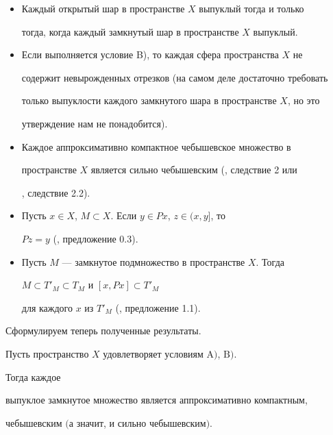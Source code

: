 \begin{itemize}


\item[1.] Каждый открытый шар в пространстве $X$ выпуклый тогда и только


тогда, когда каждый замкнутый шар в пространстве $X$ выпуклый.


\item[2.] Если выполняется условие B), то каждая сфера пространства $X$ не


содержит невырожденных отрезков (на самом деле достаточно требовать


только выпуклости каждого замкнутого шара в пространстве $X$, но это


утверждение нам не понадобится).


\item[3.] Каждое аппроксимативно компактное чебышевское множество в


пространстве $X$ является сильно чебышевским (\cite{Sin}, следствие 2 или


\cite{Vla}, следствие 2.2).


\item[4.] Пусть $x \in X$, $M \subset X$. Если $y \in Px$, $z \in (x,y]$, то


$Pz = y$ (\cite{Vla}, предложение 0.3).


\item[5.] Пусть $M$ --- замкнутое подмножество в пространстве $X$. Тогда


$M \subset T'_{M} \subset T_{M}$ и $[x,Px] \subset T'_{M}$


для каждого $x$ из $T'_{M}$ (\cite{Vla}, предложение 1.1).


\end{itemize}





Сформулируем теперь полученные результаты. 





\begin{thm}


Пусть пространство $X$ удовлетворяет условиям $\mathrm A)$, $\mathrm B)$.


Тогда каждое


выпуклое замкнутое множество является аппроксимативно компактным,


чебышевским $($а значит, и сильно чебышевским$)$.


\end{thm}





